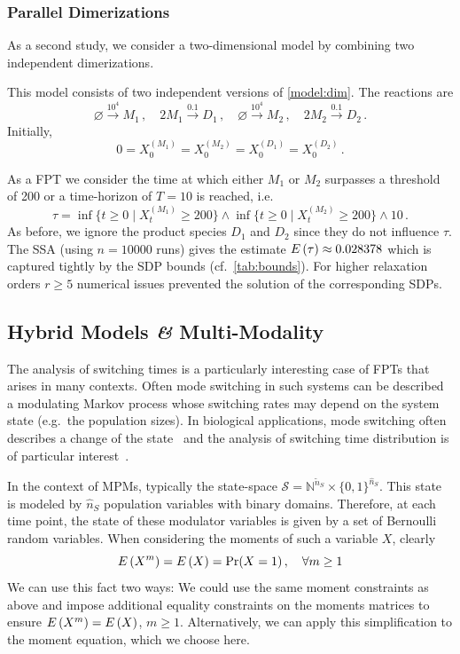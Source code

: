 \subsubsection*{Parallel Dimerizations}
As a second study, we consider a two-dimensional model by combining two
independent dimerizations.
\begin{model}\label{model:double_dim} This model consists of two independent versions of \autoref{model:dim}. The reactions are
\[
    \varnothing\xrightarrow{10^4}M_1\,,\quad
    2M_1\xrightarrow{0.1}D_1\,,\quad
    \varnothing\xrightarrow{10^4}M_2\,,\quad
    2M_2\xrightarrow{0.1}D_2\,.
\]
Initially, \[0=X_0^{(M_1)}=X_0^{(M_2)}=X_0^{(D_1)}=X_0^{(D_2)}\,.\]
\end{model}
As a \ac{FPT} we consider the time at which either $M_1$ or $M_2$ surpasses a threshold of \num{200} or a time-horizon of $T=10$
is reached, i.e.
\[ \tau=\inf\{t\geq 0\mid X_t^{(M_1)} \geq 200\}\land \inf\{t\geq 0\mid X_t^{(M_2)} \geq 200\}\land 10\,.
\]
As before, we ignore the product species $D_1$ and $D_2$ since they do not influence $\tau$.
The \ac{SSA}   (using $n=\num{10000}$ runs) gives the estimate ${E}\left(\tau\right)\approx {0.028378}$ %
which is captured tightly by the \ac{SDP} bounds (cf.\ \autoref{tab:bounds}).
For higher relaxation orders $r \geq 5$  numerical issues prevented the solution of the
corresponding \acp{SDP}.

\subsection{Hybrid Models \textit{\&} Multi-Modality}
The analysis of switching times is a particularly interesting case of \acp{FPT} that
arises in many   contexts.
Often mode switching in such systems can be described a modulating Markov process
whose switching rates may depend on the system state (e.g.\ the population sizes).
In biological applications, mode switching often describes a change of the
 state~\parencite{hasenauer2014method,stekel2008strong} and the analysis of
switching time distribution is of particular interest~\parencite{spieler2014model,barzel2008calculation}.

In the context of \acp{MPM}, typically the state-space $\mathcal{S}=
\mathbb{N}^{\tilde{n}_S}\times {\{0,1\}}^{\hat{n}_S}$.
This state is modeled by  $\hat{n}_S$ population variables with
binary domains. Therefore, at each time point, the state of these modulator variables
is given by a set of Bernoulli random variables.
When considering the moments of
such a variable $X$, clearly
\[
	{E}\left(X^m\right)={E}\left(X\right)=\Pr(X=1)\,,\quad \forall m\geq 1
\]
We can use this fact two ways: We could use the same moment
constraints
as above and impose additional equality constraints on the moments matrices
to ensure ${E}\left(X^m\right)={E}\left(X\right)$, $m\geq 1$.
Alternatively, we can apply this simplification to the moment equation, which we choose here.

